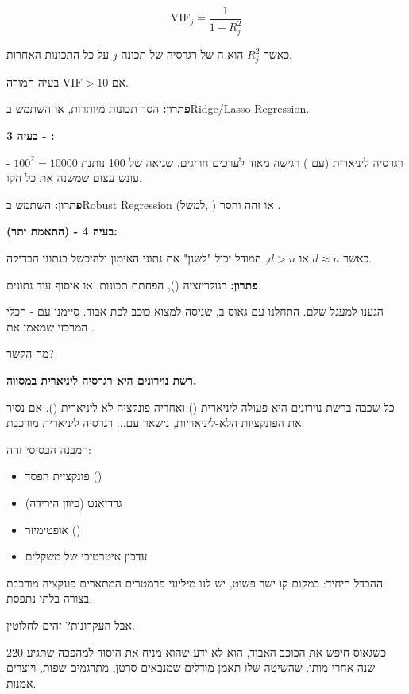 \begin{equation}
\text{VIF}_j = \frac{1}{1 - R_j^2}
\end{equation}

כאשר $R_j^2$ הוא ה\en{-}\Rsquared{} של רגרסיה של תכונה $j$ על כל התכונות האחרות.

אם $\text{VIF} > 10$ \rarrow{} בעיה חמורה.

\textbf{פתרון:} הסר תכונות מיותרות, או השתמש ב\en{-}Ridge/Lasso Regression.

\textbf{בעיה \num{3} - :}

רגרסיה ליניארית (עם ) רגישה מאוד לערכים חריגים. שגיאה של \num{100} נותנת $100^2 = 10000$ - עונש עצום שמשנה את כל הקו.

\textbf{פתרון:} השתמש ב\en{-}Robust Regression (למשל, ) או זהה והסר .

\textbf{בעיה \num{4} -  (התאמת יתר):}

כאשר $d \approx n$ או $d > n$, המודל יכול "לשנן" את נתוני האימון ולהיכשל בנתוני הבדיקה.

\textbf{פתרון:} רגולריזציה (), הפחתת תכונות, או איסוף עוד נתונים.


הגענו למעגל שלם. התחלנו עם גאוס ב\en{-}, שניסה למצוא כוכב לכת אבוד. סיימנו עם  - הכלי המרכזי שמאמן את .

מה הקשר?

\textbf{רשת נוירונים היא רגרסיה ליניארית במסווה.}

כל שכבה ברשת נוירונים היא פעולה ליניארית () ואחריה פונקציה לא-ליניארית (). אם נסיר את הפונקציות הלא-ליניאריות, נישאר עם... רגרסיה ליניארית מורכבת.

המבנה הבסיסי זהה:
\begin{itemize}
\item פונקציית הפסד ()
\item גרדיאנט (כיוון הירידה)
\item אופטימיזר ()
\item עדכון איטרטיבי של משקלים
\end{itemize}

ההבדל היחיד: במקום קו ישר פשוט, יש לנו מיליוני פרמטרים המתארים פונקציה מורכבת בצורה בלתי נתפסת.

אבל העקרונות? זהים לחלוטין.

כשגאוס חיפש את הכוכב האבוד, הוא לא ידע שהוא מניח את היסוד למהפכה שתגיע \num{220} שנה אחרי מותו. שהשיטה שלו תאמן מודלים שמנבאים סרטן, מתרגמים שפות, ויוצרים אמנות.

